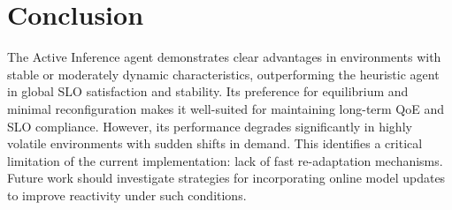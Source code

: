 \chapter{Conclusion}
The Active Inference agent demonstrates clear advantages in environments with stable or moderately dynamic characteristics, outperforming the heuristic agent in global SLO satisfaction and stability. Its preference for equilibrium and minimal reconfiguration makes it well-suited for maintaining long-term QoE and SLO compliance. However, its performance degrades significantly in highly volatile environments with sudden shifts in demand. This identifies a critical limitation of the current implementation: lack of fast re-adaptation mechanisms. Future work should investigate strategies for incorporating online model updates to improve reactivity under such conditions.